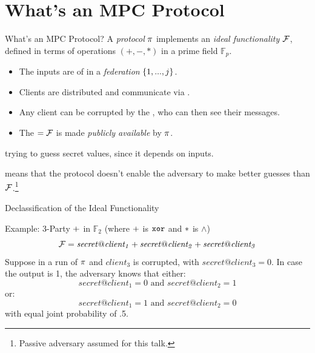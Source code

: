 \documentclass{beamer}
\begin{document}
\section{What's an MPC Protocol}

\begin{frame}{What's an MPC Protocol?}
  A \emph{protocol} $\pi$ implements an \emph{ideal functionality} $\mathcal{F}$,
  defined in terms of operations $(+,-,*)$ in a prime field $\mathbb{F}_p$.
  \begin{itemize}
  \item The inputs are  of  in a \emph{federation}
    $\{ 1,...,j \}$.
  \item Clients are distributed and communicate via .
  \item Any client can be corrupted by the , who can then see their messages.
  \item The  $=\mathcal{F}$ is made \emph{publicly available} by $\pi$.
  \end{itemize}
   trying to
  guess secret values, since it depends on inputs.

  \medskip
  
   means that the protocol doesn't enable the adversary
  to make better guesses than $\mathcal{F}$.\footnote{Passive adversary assumed for this talk.}

\end{frame}

\begin{frame}{Declassification of the Ideal Functionality}

  \begin{exampleblock}{Example: 3-Party $+$ in $\mathbb{F}_2$ (where $+$ is $\texttt{xor}$ and $*$ is $\wedge$)}
  $$
    \mathcal{F} =
    \mathit{secret}@{\mathit{client_1}} + \mathit{secret}@{\mathit{client_2}} + 
      \mathit{secret}@{\mathit{client_3}}
  $$
  Suppose in a run of $\pi$ and $\mathit{client_3}$ is
  corrupted, with $\mathit{secret}@{\mathit{client_3}} = 0$. 
  In case the output is 1, the adversary knows that either:
  $$
  \mathit{secret}@{\mathit{client_1}} = 0 \text{\ and\ } \mathit{secret}@{\mathit{client_2}} = 1
  $$
  or:
  $$
  \mathit{secret}@{\mathit{client_1}} = 1 \text{\ and\ } \mathit{secret}@{\mathit{client_2}} = 0
  $$
  with equal joint probability of .5.

  \medskip

  \end{exampleblock}

\end{frame}  
\end{document}
